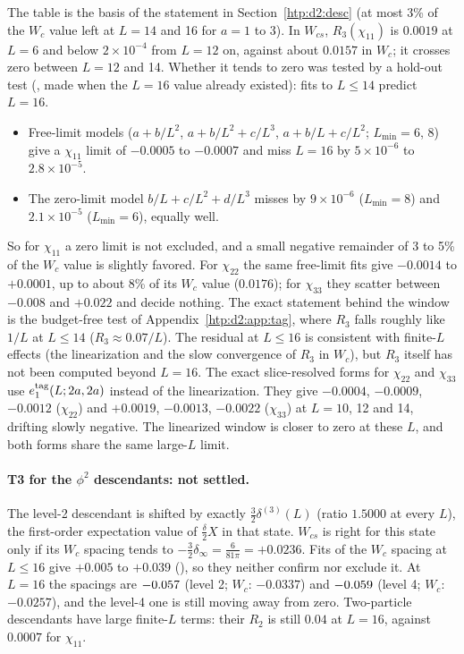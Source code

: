 The table is the basis of the statement in Section~\ref{htp:d2:desc} (at most 3\% of the $W_c$ value left at $L=14$ and 16
for $a=1$ to 3). In $W_{cs}$, $R_3(\chi_{11})$ is $0.0019$ at $L=6$ and below $2\times10^{-4}$ from $L=12$
on, against about $0.0157$ in $W_c$; it crosses zero between $L=12$ and 14. Whether it tends to zero was tested by a hold-out test (, made when the $L=16$ value already existed):
fits to $L\le14$ predict $L=16$.
\begin{itemize}
\item Free-limit models ($a+b/L^2$, $a+b/L^2+c/L^3$, $a+b/L+c/L^2$; $L_{\min}=6$, 8) give a $\chi_{11}$ limit of $-0.0005$ to
 $-0.0007$ and miss $L=16$ by $5\times10^{-6}$ to $2.8\times10^{-5}$.
\item The zero-limit model $b/L+c/L^2+d/L^3$ misses by $9\times10^{-6}$ ($L_{\min}=8$) and $2.1\times10^{-5}$ ($L_{\min}=6$), equally
 well.
\end{itemize}
So for $\chi_{11}$ a zero limit is not excluded, and a small negative remainder of 3 to 5\% of the $W_c$ value is slightly
favored. For $\chi_{22}$ the same free-limit fits give $-0.0014$ to $+0.0001$, up to about 8\% of its $W_c$ value ($0.0176$); for
$\chi_{33}$ they scatter between $-0.008$ and $+0.022$ and decide nothing. The exact statement behind the window
is the budget-free test of Appendix~\ref{htp:d2:app:tag}, where $R_3$ falls roughly like $1/L$ at $L\le14$ ($R_3\approx0.07/L$). The residual at $L\le16$ is consistent with
finite-$L$ effects (the linearization and the slow convergence of $R_3$ in $W_c$), but $R_3$ itself has not been computed
beyond $L=16$. The exact slice-resolved forms for $\chi_{22}$ and $\chi_{33}$ use $e_1^{\rm tag}(L;2a,2a)$ instead of the
linearization. They give $-0.0004$, $-0.0009$, $-0.0012$ ($\chi_{22}$) and $+0.0019$, $-0.0013$, $-0.0022$ ($\chi_{33}$) at
$L=10$, 12 and 14, drifting slowly negative. The linearized window is closer to zero at these $L$, and both forms share the
same large-$L$ limit.

\paragraph{T3 for the $\phi^2$ descendants: not settled.} The level-2 descendant is shifted by exactly $\frac32\delta^{(3)}(L)$
(ratio $1.5000$ at every $L$), the first-order expectation value of $\frac\delta2X$ in that state. $W_{cs}$ is right for this
state only if its $W_c$ spacing tends to $-\frac32\delta_\infty=\frac6{81\pi}=+0.0236$. Fits of the $W_c$ spacing at $L\le16$
give $+0.005$ to $+0.039$ (), so they neither confirm nor exclude it. At $L=16$ the spacings are
$-0.057$ (level 2; $W_c$: $-0.0337$) and $-0.059$ (level 4; $W_c$: $-0.0257$), and the level-4 one is still
moving away from zero. Two-particle descendants have large finite-$L$ terms: their $R_2$ is still $0.04$ at $L=16$, against
$0.0007$ for $\chi_{11}$.


